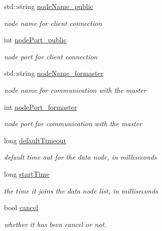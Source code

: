 \begin{DoxyCompactItemize}
\item 
std\-::string \hyperlink{classDataNode_afc6ee468a328c1f6004e81ddf123804b}{node\-Name\-\_\-public}
\begin{DoxyCompactList}\small\item\em node name for client connection \end{DoxyCompactList}\item 
int \hyperlink{classDataNode_a0cf1261ec432ee38f2fbd3ff4cfff5eb}{node\-Port\-\_\-public}
\begin{DoxyCompactList}\small\item\em node port for client connection \end{DoxyCompactList}\item 
std\-::string \hyperlink{classDataNode_a3d6d0ffea35a5806fc86c4aa5484f2f2}{node\-Name\-\_\-formaster}
\begin{DoxyCompactList}\small\item\em node name for communication with the master \end{DoxyCompactList}\item 
int \hyperlink{classDataNode_aa0047e3d31e28ca707f46138ded5f152}{node\-Port\-\_\-formaster}
\begin{DoxyCompactList}\small\item\em node port for communication with the master \end{DoxyCompactList}\item 
long \hyperlink{classDataNode_ab1ee6091587c21e54d4564869431c7f0}{default\-Timeout}
\begin{DoxyCompactList}\small\item\em default time out for the data node, in milliseconds \end{DoxyCompactList}\item 
long \hyperlink{classDataNode_ae2e3f7f945adb505b53b1e13a2e82bf5}{start\-Time}
\begin{DoxyCompactList}\small\item\em the time it joins the data node list, in milliseconds \end{DoxyCompactList}\item 
bool \hyperlink{classDataNode_ab0fde2dcd093b8d7beb962993e078b38}{cancel}
\begin{DoxyCompactList}\small\item\em whether it has been cancel or not. \end{DoxyCompactList}\end{DoxyCompactItemize}



